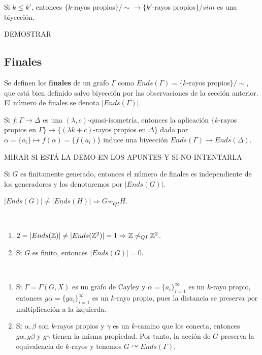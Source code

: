 \documentclass[twoside, 11pt]{article}
\begin{document}
\begin{prop}
Si $k\leq k'$, entonces $\{ k$-rayos propios$\}/\sim\longrightarrow\{k'$-rayos propios$\}/sim$ es una biyección. 
\end{prop}
\begin{dem}
DEMOSTRAR
\QED
\end{dem}

\subsection{Finales}

\begin{defi}
Se definen los \textbf{finales} de un grafo $\Gamma$ como $Ends(\Gamma)=\{ k$-rayos propios$\}/\sim$, que está bien definido salvo biyección por las observaciones de la sección anterior. El número de finales se denota $|Ends(\Gamma)|$.
\end{defi}

\begin{lemma}
Si $f:\Gamma\to\Delta$ es una $(\lambda,c)$-quasi-isometría, entonces la aplicación $\{ k$-rayos propios en $\Gamma\}\longrightarrow\{(\lambda k+c)$-rayos propios en $\Delta\}$ dada por $\alpha=\{a_i\}\mapsto f(\alpha)=\{f(a_i)\}$ induce una biyección $Ends(\Gamma)\to Ends(\Delta)$. 
\end{lemma}

MIRAR SI ESTÁ LA DEMO EN LOS APUNTES Y SI NO INTENTARLA

\begin{coro}
Si $G$ es finitamente generado, entonces el número de finales es independiente de los generadores y los denotaremos por $|Ends(G)|$.
\end{coro}

\begin{coro}
$|Ends(G)|\neq |Ends(H)|\Rightarrow G\not\sim_{QI} H$.
\end{coro}

\begin{ejs}\
\begin{enumerate}
\item $2=|Ends(\mathbb{Z})|\neq |Ends(\mathbb{Z}^2)|=1\Rightarrow \mathbb{Z}\not\sim_{QI}\mathbb{Z}^2$.
\item Si $G$ es finito, entonces $|Ends(G)|=0$.
\end{enumerate}
\end{ejs}

\begin{observaciones}\
\begin{enumerate}
\item Si $\Gamma=\Gamma(G,X)$ es un grafo de Cayley y $\alpha=\{a_i\}_{i=1}^\infty$ es un $k$-rayo propio, entonces $g\alpha=\{ga_i\}_{i=1}^\infty$ es un $k$-rayo propio, pues la distancia se preserva por multiplicación a la izquierda. 
\item Si $\alpha,\beta$ son $k$-rayos propios y $\gamma$ es un $k$-camino que los conecta, entonces $g\alpha,g\beta$ y $g\gamma$ tienen la misma propiedad.  Por tanto, la acción de $G$ preserva la equivalencia de $k$-rayos y tenemos  $G\curvearrowright Ends(\Gamma)$. 
\end{enumerate}
\end{observaciones}
\end{document}
